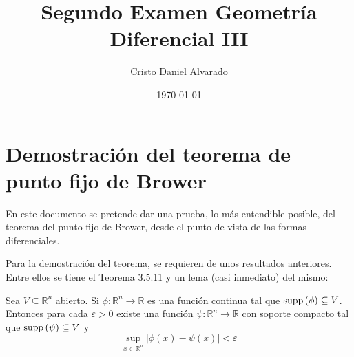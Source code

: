 \documentclass[12pt]{report}
\theoremstyle{largebreak}
\newcommand\abs[1]{\ensuremath{\lvert#1\rvert}}
\newcommand\cf[3]{\ensuremath{#1:#2\rightarrow#3}}
\newcommand\supp[1]{\ensuremath{\textup{supp}\left(#1\right)}}
\begin{document}
    \title{Segundo Examen Geometría Diferencial III}
    \author{Cristo Daniel Alvarado}
    \date{\today}
    \maketitle

    \setcounter{chapter}{1} %
        
    \section{Demostración del teorema de punto fijo de Brower}
    
En este documento se pretende dar una prueba, lo más entendible posible, del teorema del punto fijo de Brower, desde el punto de vista de las formas diferenciales. 

Para la demostración del teorema, se requieren de unos resultados anteriores. Entre ellos se tiene el Teorema 3.5.11 y un lema (casi inmediato) del mismo:

\begin{theor}
    Sea $V\subseteq\mathbb{R}^n$ abierto. Si $\cf{\phi}{\mathbb{R}^n}{\mathbb{R}}$ es una función continua tal que $\supp{\phi}\subseteq V$. Entonces para cada $\varepsilon>0$ existe una función $\cf{\psi}{\mathbb{R}^n}{\mathbb{R}}$ con soporte compacto tal que $\supp{\psi}\subseteq V$ y
    \begin{equation*}
        \sup_{x\in\mathbb{R}^n}\abs{\phi(x)-\psi(x)}<\varepsilon
    \end{equation*}
\end{theor}
\end{document}
